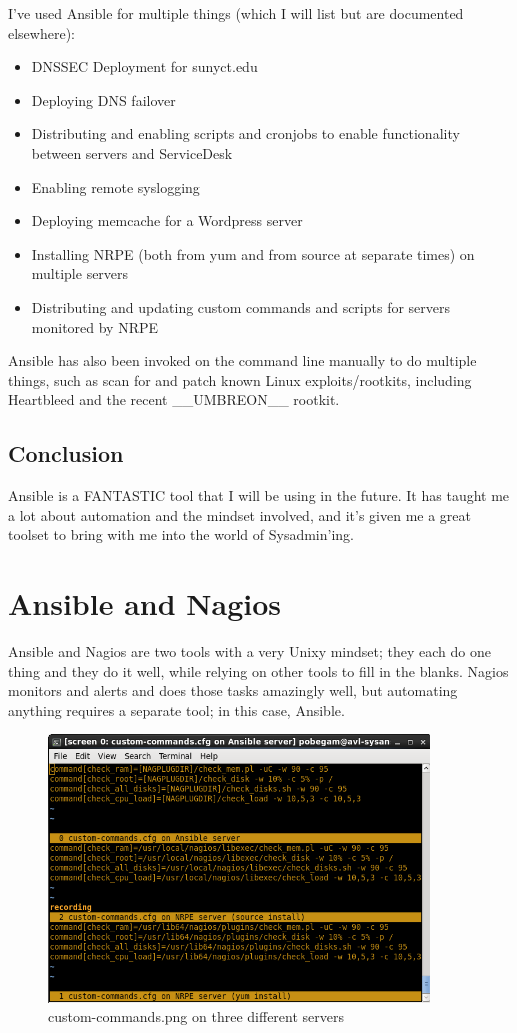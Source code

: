 \documentclass[a4paper]{article}
\begin{document}
I've used Ansible for multiple things (which I will list but are documented elsewhere):
\begin{itemize}
	\item DNSSEC Deployment for sunyct.edu
    \item Deploying DNS failover
    \item Distributing and enabling scripts and cronjobs to enable functionality between servers and ServiceDesk
    \item Enabling remote syslogging
    \item Deploying memcache for a Wordpress server
    \item Installing NRPE (both from yum and from source at separate times) on multiple servers
    \item Distributing and updating custom commands and scripts for servers monitored by NRPE
\end{itemize}

Ansible has also been invoked on the command line manually to do multiple things, such as scan for and patch known Linux exploits/rootkits, including Heartbleed and the recent \_\_UMBREON\_\_ rootkit.

\subsection{Conclusion}

Ansible is a FANTASTIC tool that I will be using in the future. It has taught me a lot about automation and the mindset involved, and it's given me a great toolset to bring with me into the world of Sysadmin'ing.

\section{Ansible and Nagios}

Ansible and Nagios are two tools with a very Unixy mindset; they each do one thing and they do it well, while relying on other tools to fill in the blanks. Nagios monitors and alerts and does those tasks amazingly well, but automating anything requires a separate tool; in this case, Ansible.

\begin{figure}[H]
\centering
\includegraphics[width=0.9\textwidth]{customcommands.png}
\caption{\label{fig:customcommands}custom-commands.png on three different servers}
\end{figure}
\end{document}
